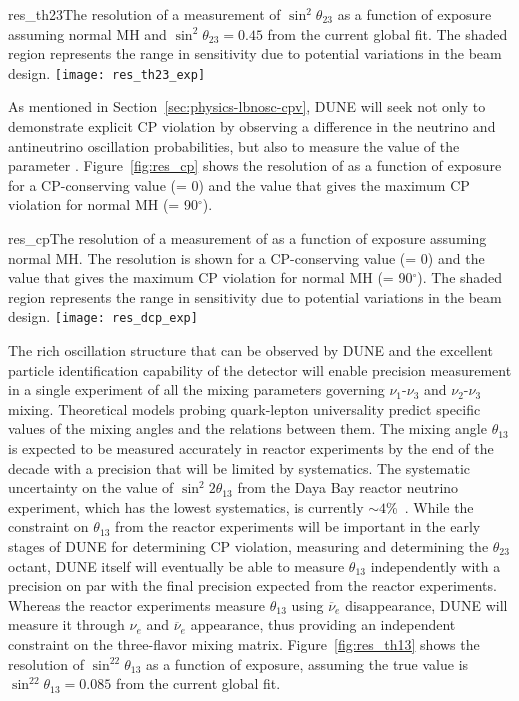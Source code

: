 \begin{cdrfigure}{res_th23}{The resolution of a measurement of $\sin^2\theta_{23}$ as a function of exposure assuming normal MH and $\sin^2\theta_{23} = 0.45$ from the current global fit. The shaded region represents the range in sensitivity due to potential variations in the beam design.  }
 \texttt{[image: res\_th23\_exp]}
\end{cdrfigure}


As mentioned in Section~\ref{sec:physics-lbnosc-cpv}, DUNE will seek not only to demonstrate explicit CP violation by observing a difference in the neutrino and antineutrino oscillation probabilities, but also to measure the value of the parameter \deltacp.  Figure~\ref{fig:res_cp} shows the resolution of \deltacp as a function of exposure for a CP-conserving value (\deltacp = 0) and the value that gives the maximum CP violation for normal MH (\deltacp = 90\mbox{$^{\circ}$}).

\begin{cdrfigure}{res_cp}{The resolution of a measurement of \deltacp as a function of exposure assuming normal MH.  The resolution is shown for a CP-conserving value (\deltacp = 0) and the value that gives the maximum CP violation for normal MH (\deltacp = 90\mbox{$^{\circ}$}). The shaded region represents the range in sensitivity due to potential variations in the beam design.  }
 \texttt{[image: res\_dcp\_exp]}
\end{cdrfigure}

The rich oscillation structure that can be observed by DUNE and the
excellent particle identification capability of the detector
will enable precision measurement  in a single experiment of all the mixing parameters
governing $\nu_1$-$\nu_3$ and $\nu_2$-$\nu_3$ mixing. Theoretical models probing quark-lepton
universality predict specific values of the mixing angles and the
relations between them. The
mixing angle $\theta_{13}$ is
expected to be measured accurately in reactor experiments by the end
of the decade with a precision that will be limited by
systematics. The systematic uncertainty on the value of $\sin ^ 2 2
\theta_{13}$ from the Daya Bay reactor neutrino experiment, which has
the lowest systematics, is currently $\sim4$\%~\cite{An:2013zwz}.
While the constraint on $\theta_{13}$ from the reactor experiments will be
important in the
early stages of DUNE for determining CP violation, measuring
\deltacp and determining the $\theta_{23}$ octant, 
DUNE itself will eventually be able to measure
$\theta_{13}$ independently with a precision on par with the final
precision expected from the reactor experiments. 
Whereas the reactor experiments measure $\theta_{13}$ using $\overline{\nu}_e$
disappearance, DUNE will measure it through $\nu_e$ and
$\overline{\nu}_e$ appearance, thus providing an independent constraint on
the three-flavor mixing matrix.   Figure~\ref{fig:res_th13} shows the resolution of $\sin^22\theta_{13}$ as a function of exposure, assuming the true value is $\sin^22\theta_{13} = 0.085$ from the current global fit.


